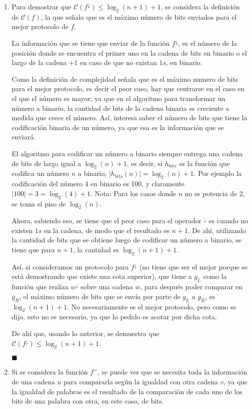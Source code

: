 \documentclass[letter]{article}
\begin{document}
	\begin{pregunta}{2}
		\begin{enumerate}
		\item Para demostrar que $\mathcal{C}(f^{\downarrow}) \leq \log_{2}(n+1)+1$, se considera la definición de $\mathcal{C}(f)$, la que señala que es el máximo número de bits enviados para el mejor protocolo de $f$.
		
		La información que se tiene que enviar de la función $f^\downarrow$, es el número de la posición donde se encuentra el primer uno en la cadena de bits en binario o el largo de la cadena $+ 1$ en caso de que no existan $1s$, en binario.
		
		Como la definición de complejidad señala que es el máximo numero de bits para el mejor protocolo, es decir el peor caso, hay que centrarse en el caso en el que el número es mayor, ya que en el algoritmo para transformar un número a binario, la cantidad de bits de la cadena binaria es creciente a medida que crece el número. Así, interesa saber el número de bits que tiene la codificación binaria de un número, ya que esa es la información que se enviará.
		
		El algoritmo para codificar un número a binario siempre entrega una cadena de bits de largo igual a $\log_2(n) + 1$, es decir, si $h_{bits}$ es la función que codifica un número $n$ a binario, $|h_{bits}(n)|=\log_2(n) + 1$. Por ejemplo la codificación del número 4 en binario es 100, y claramente $|100|=3=\log_2(4)+1$. Nota: Para los casos donde $n$ no es potencia de 2, se toma el piso de $\log_2(n)$.
		
		Ahora, sabiendo eso, se tiene que el peor caso para el operador $ ^\downarrow$ es cuando no existen $1s$ en la cadena, de modo que el resultado es $n+1$. De ahí, utilizando la cantidad de bits que se obtiene luego de codificar un número a binario, se tiene que para $n+1$, la cantidad es $\log_2(n+1) + 1$.
		
		Así, si consideramos un protocolo para $f^\downarrow$ (no tiene que ser el mejor porque se está demostrando que existe una cota superior), que tiene a $g_L$ como la función que realiza $w^\downarrow$ sobre una cadena $w$, para después poder comparar en $g_B$, el máximo número de bits que se envía por parte de $g_L$ a $g_B$, es $\log_{2}(n+1)+1$. No necesariamente es el mejor protocolo, pero como se dijo, esto no es necesario, ya que lo pedido es acotar por dicha cota.
		
		De ahí que, usando lo anterior, se demuestra que $\mathcal{C}(f^{\downarrow}) \leq \log_{2}(n+1)+1$.
		\begin{flushright}$\blacksquare$\end{flushright}	
		\item Si se considera la función $f^=$, se puede ver que se necesita toda la información de una cadena $u$ para compararla según la igualdad con otra cadena $v$, ya que la igualdad de palabras es el resultado de la comparación de cada uno de los bits de una palabra con otra, en este caso, de bits. 
		

\end{enumerate}
\end{pregunta}
\end{document}
